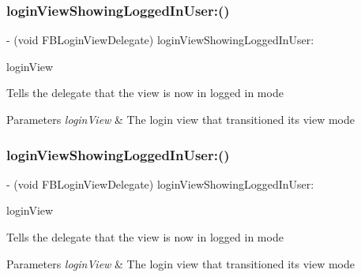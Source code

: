 \subsubsection{\texorpdfstring{login\+View\+Showing\+Logged\+In\+User\+:()}{loginViewShowingLoggedInUser:()}\hspace{0.1cm}{\footnotesize\ttfamily [2/5]}}
{\footnotesize\ttfamily -\/ (void F\+B\+Login\+View\+Delegate) login\+View\+Showing\+Logged\+In\+User\+: \begin{DoxyParamCaption}\item[{(\hyperlink{interfaceFBLoginView}{F\+B\+Login\+View} $\ast$)}]{login\+View }\end{DoxyParamCaption}\hspace{0.3cm}{\ttfamily [optional]}}

Tells the delegate that the view is now in logged in mode


\begin{DoxyParams}{Parameters}
{\em login\+View} & The login view that transitioned its view mode \\
\hline
\end{DoxyParams}
\mbox{\label{protocolFBLoginViewDelegate_01-p_a1f8604ad00171b432bdb0e4582856db9}} 
\subsubsection{\texorpdfstring{login\+View\+Showing\+Logged\+In\+User\+:()}{loginViewShowingLoggedInUser:()}\hspace{0.1cm}{\footnotesize\ttfamily [3/5]}}
{\footnotesize\ttfamily -\/ (void F\+B\+Login\+View\+Delegate) login\+View\+Showing\+Logged\+In\+User\+: \begin{DoxyParamCaption}\item[{(\hyperlink{interfaceFBLoginView}{F\+B\+Login\+View} $\ast$)}]{login\+View }\end{DoxyParamCaption}\hspace{0.3cm}{\ttfamily [optional]}}

Tells the delegate that the view is now in logged in mode


\begin{DoxyParams}{Parameters}
{\em login\+View} & The login view that transitioned its view mode \\
\hline
\end{DoxyParams}
\mbox{\label{protocolFBLoginViewDelegate_01-p_a1f8604ad00171b432bdb0e4582856db9}} 
